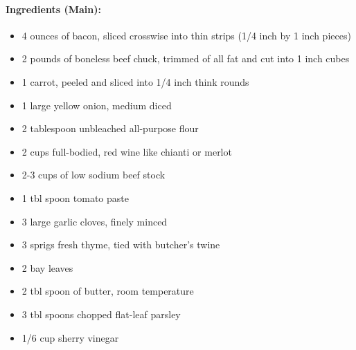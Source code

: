\documentclass{article}
\begin{document}
\paragraph{Ingredients (Main):}
\begin{itemize}
	\item 4 ounces of bacon, sliced crosswise into thin strips (1/4 inch by 1 inch pieces)
	\item 2 pounds of boneless beef chuck, trimmed of all fat and cut into 1 inch cubes
	\item 1 carrot, peeled and sliced into 1/4 inch think rounds
	\item 1 large yellow onion, medium diced
	\item 2 tablespoon unbleached all-purpose flour
	\item 2 cups full-bodied, red wine like chianti or merlot
	\item 2-3 cups of low sodium beef stock
	\item 1 tbl spoon tomato paste
	\item 3 large garlic cloves, finely minced
	\item 3 sprigs fresh thyme, tied with butcher's twine
	\item 2 bay leaves
	\item 2 tbl spoon of butter, room temperature
	\item 3 tbl spoons chopped flat-leaf parsley
	\item 1/6 cup sherry vinegar
\end{itemize}
\end{document}
